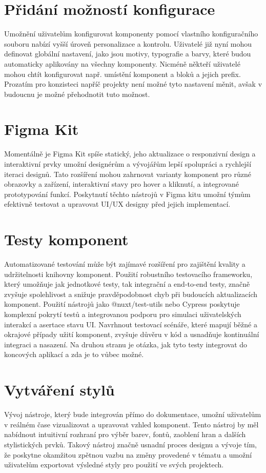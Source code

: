 \section{Přidání možností konfigurace}
Umožnění uživatelům konfigurovat komponenty pomocí vlastního konfiguračního souboru nabízí vyšší úroveň personalizace a kontrolu. Uživatelé již nyní mohou definovat globální nastavení, jako jsou motivy, typografie a barvy, které budou automaticky aplikovány na všechny komponenty. Nicméně někteří uživatelé mohou chtít konfigurovat např. umístění komponent a bloků a jejich prefix. Prozatím pro konzisteci napříč projekty není možné tyto nastavení měnit, avšak v budoucnu je možné přehodnotit tuto možnost.

\section{Figma Kit}
Momentálně je Figma Kit spíše statický, jeho aktualizace o responzivní design a interaktivní prvky umožní designérům a vývojářům lepší spolupráci a rychlejší iteraci designů. Tato rozšíření mohou zahrnovat varianty komponent pro různé obrazovky a zařízení, interaktivní stavy pro hover a kliknutí, a integrované prototypování funkcí. Poskytnutí těchto nástrojů v Figma kitu umožní týmům efektivně testovat a upravovat UI/UX designy před jejich implementací.

\section{Testy komponent}
Automatizované testování může být zajímavé rozšíření pro zajištění kvality a udržitelnosti knihovny komponent. Použití robustního testovacího frameworku, který umožňuje jak jednotkové testy, tak integrační a end-to-end testy, značně zvyšuje spolehlivost a snižuje pravděpodobnost chyb při budoucích aktualizacích komponent. Použití nástrojů jako @nuxt/test-utils nebo Cypress poskytuje komplexní pokrytí testů a integrovanou podporu pro simulaci uživatelských interakcí a asertace stavu UI. Navrhnout testovací scénáře, které mapují běžné a okrajové případy užití komponent, zvyšuje důvěru v kód a usnadňuje kontinuální integraci a nasazení. Na druhou stranu je otázka, jak tyto testy integrovat do koncových aplikací a zda je to vůbec možné.

\section{Vytváření stylů}
Vývoj  nástroje, který bude integrován přímo do dokumentace, umožní uživatelům v reálném čase vizualizovat a upravovat vzhled komponent. Tento nástroj by měl nabídnout intuitivní rozhraní pro výběr barev, fontů, zaoblení hran a dalších stylistických prvků. Takový nástroj značně usnadní proces designu a vývoje tím, že poskytne okamžitou zpětnou vazbu na změny provedené v tématu a umožní uživatelům exportovat výsledné styly pro použití ve svých projektech.

